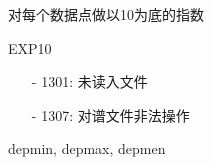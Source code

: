 \label{cmd:exp10}

对每个数据点做以10为底的指数

\begin{SACSTX}
EXP10
\end{SACSTX}

\begin{itemize}
\item[-]1301: 未读入文件
\item[-]1307: 对谱文件非法操作
\end{itemize}

depmin, depmax, depmen
